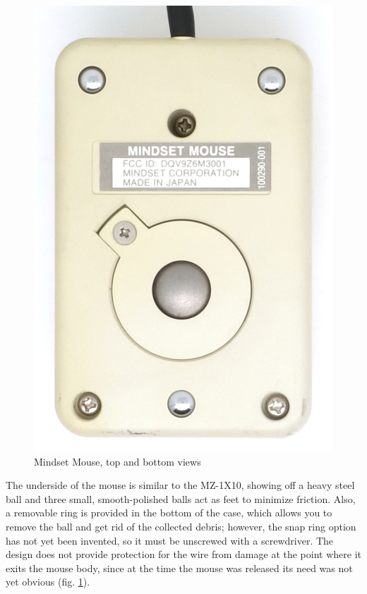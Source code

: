 \documentclass[11pt, a4paper]{article}
\begin{document}
\begin{figure}[h]
    \includegraphics[scale=0.6]{1984_mindset_mouse/bottom_30.jpg}
    \caption{Mindset Mouse, top and bottom views}
    \label{fig:MindsetMouseTopAndBottom}
\end{figure}

The underside of the mouse is similar to the MZ-1X10, showing off a heavy steel ball and three small, smooth-polished balls act as feet to minimize friction. Also, a removable ring is provided in the bottom of the case, which allows you to remove the ball and get rid of the collected debris; however, the snap ring option has not yet been invented, so it must be unscrewed with a screwdriver. The design does not provide protection for the wire from damage at the point where it exits the mouse body, since at the time the mouse was released its need was not yet obvious (fig. \ref{fig:MindsetMouseTopAndBottom}).
\end{document}
